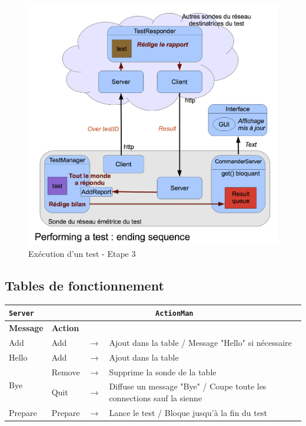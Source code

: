 \documentclass[a4paper,11pt]{article}
\newcommand{\cd}[1]{\texttt{#1}}
\begin{document}
\begin{figure}[!ht]
\centering\includegraphics[width=\linewidth]{img/graphTest3.png}
\caption{Exécution d'un test - Etape 3}
\end{figure}




\subsection{Tables de fonctionnement}
\begin{center}
\begin{tabular}{|l|l|c|l|}
\hline
\cd{Server} & \multicolumn{3}{|c|}{\cd{ActionMan}} \\
\hline
\textbf{Message} & \textbf{Action} & & \\
\hline
Add & Add & $\longrightarrow$ & Ajout dans la table / Message "Hello" si nécessaire\\
\hline
Hello & Add & $\longrightarrow$ & Ajout dans la table\\
\hline
\multirow{2}{*}{Bye} & Remove & $\longrightarrow$ & Supprime la sonde de la table\\
\cline{2-4}
 & Quit & $\longrightarrow$ & Diffuse un message "Bye" / Coupe toute les connections sauf la sienne\\
\hline
Prepare & Prepare & $\longrightarrow$ & Lance le test / Bloque jusqu'à la fin du test \\
\hline
\end{tabular}
\end{center}
\end{document}
